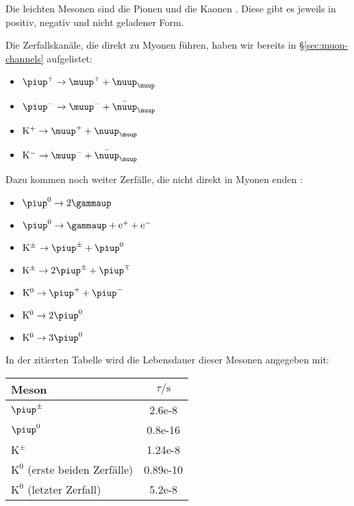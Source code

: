 \documentclass[11pt, ngerman, fleqn, DIV=15, headinclude, BCOR=2cm]{scrreprt}
\begin{document}
Die leichten Mesonen sind die Pionen und die Kaonen
\parencite[Tabelle~19.6]{meschede-gerthsen_24}. Diese gibt es jeweils in
positiv, negativ und nicht geladener Form.

Die Zerfallskanäle, die direkt zu Myonen führen, haben wir bereits in
§\ref{sec:muon-channels} aufgelistet:

\begin{itemize}
    \item
        $\piup^+ \to \muup^+ + \nuup_\muup$
    \item
        $\piup^- \to \muup^- + \bar \nuup_\muup$
    \item
        $\mathrm K^+ \to \muup^+ + \nuup_\muup$
    \item
        $\mathrm K^- \to \muup^- + \bar \nuup_\muup$
\end{itemize}

Dazu kommen noch weiter Zerfälle, die nicht direkt in Myonen enden
\parencite[Tabelle~19.6]{meschede-gerthsen_24}:

\begin{itemize}
    \item
        $\piup^0 \to 2 \gammaup$
    \item
        $\piup^0 \to \gammaup + \eup^+ + \eup^-$
    \item
        $\mathrm K^\pm \to \piup^\pm + \piup^0$
    \item
        $\mathrm K^\pm \to 2 \piup^\pm + \piup^\mp$
    \item
        $\mathrm K^0 \to \piup^+ + \piup^-$
    \item
        $\mathrm K^0 \to 2 \piup^0$
    \item
        $\mathrm K^0 \to 3 \piup^0$
\end{itemize}

In der zitierten Tabelle wird die Lebensdauer dieser Mesonen angegeben mit:

\begin{tabular}{lS}
    Meson & {$\tau/\si\second$} \\
    \midrule
    $\piup^\pm$ & 2.6e-8 \\
    $\piup^0$ & 0.8e-16 \\
    $\mathrm K^\pm$ & 1.24e-8 \\
    $\mathrm K^0$ (erste beiden Zerfälle) & 0.89e-10 \\
    $\mathrm K^0$ (letzter Zerfall) & 5.2e-8 \\
\end{tabular}
\end{document}
